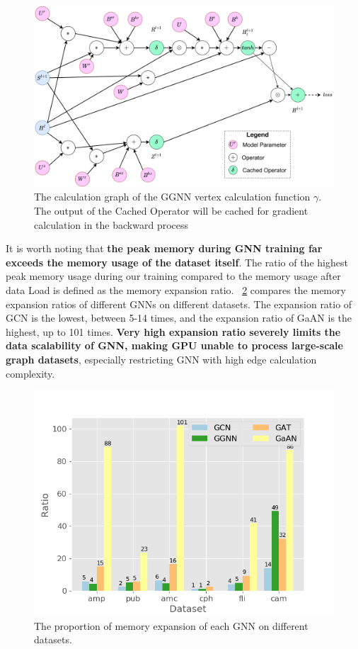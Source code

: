 \begin{figure}
    \centering
    \includegraphics[width=0.7\columnwidth]{figs/illustration/ggnn_vertex_func_computation_graph.png}
    \caption{The calculation graph of the GGNN vertex calculation function $\gamma$. The output of the Cached Operator will be cached for gradient calculation in the backward process}
    \label{fig:ggnn_vertex_func_computation_graph}
\end{figure}

It is worth noting that \textbf{the peak memory during GNN training far exceeds the memory usage of the dataset itself}.
The ratio of the highest peak memory usage during our training compared to the memory usage after data Load is
defined as the memory expansion ratio. \figurename~\ref{fig:exp_memory_expansion_ratio} compares the memory expansion ratios
of different GNNs on different datasets. The expansion ratio of GCN is the lowest, between 5-14 times,
and the expansion ratio of GaAN is the highest, up to 101 times.
\textbf{Very high expansion ratio severely limits the data scalability of GNN, making GPU unable to process large-scale graph datasets},
especially restricting GNN with high edge calculation complexity.

\begin{figure}
    \centering
    \includegraphics[width=0.7\columnwidth]{figs/experiments/exp_memory_expansion_ratio.png}
    \caption{The proportion of memory expansion of each GNN on different datasets.}
    \label{fig:exp_memory_expansion_ratio}
\end{figure}


